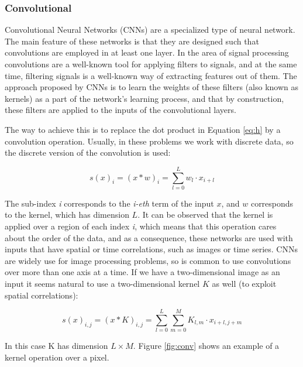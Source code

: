 \subsubsection{Convolutional}
    
Convolutional Neural Networks (CNNs) are a specialized type of neural network. The main feature of these networks is that they are designed such that convolutions are employed in at least one layer. In the area of signal processing convolutions are a well-known tool for applying filters to signals, and at the same time, filtering signals is a well-known way of extracting features out of them. The approach proposed by CNNs is to learn the weights of these filters (also known as kernels) as a part of the network's learning process, and that by construction, these filters are applied to the inputs of the convolutional layers.

The way to achieve this is to replace the dot product in Equation \ref{eq:h} by a convolution operation. Usually, in these problems we work with discrete data, so the discrete version of the convolution is used:

\begin{equation}
    s(x)_{i} = (x * w)_{i} = \sum_{l=0}^{L}w_{l} \cdot x_{i+l}
\end{equation}
    
The sub-index \emph{i} corresponds to the \emph{i-eth} term of the input $x$, and $w$ corresponds to the kernel, which has dimension $L$. It can be observed that the kernel is applied over a region of each index \emph{i}, which means that this operation cares about the order of the data, and as a consequence, these networks are used with inputs that have spatial or time correlations, such as images or time series. CNNs are widely use for image processing problems, so is common to use convolutions over more than one axis at a time. If we have a two-dimensional image as an input it seems natural to use a two-dimensional kernel $K$ as well (to exploit spatial correlations):

\begin{equation}
    s(x)_{i,j} = (x * K)_{i,j} = \sum_{l=0}^{L}\sum_{m=0}^{M}K_{l, m} \cdot x_{i+l, j+m}
\end{equation}

In this case K has dimension $L \times M$. Figure \ref{fig:conv} shows an example of a kernel operation over a pixel.

